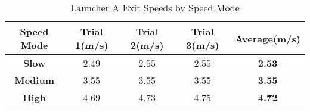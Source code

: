 \documentclass[12pt]{article}
\begin{document}
\begin{table}[H]
    \centering
    \begin{tabular}{|c|c|c|c|c|}
        \hline
        \textbf{Speed Mode} & \textbf{Trial 1}(m/s) & \textbf{Trial 2}(m/s) & \textbf{Trial 3}(m/s) & \textbf{Average}(m/s) \\ 
        \hline
        \textbf{Slow} & 2.49 & 2.55 & 2.55 & \textbf{2.53} \\ 
        \hline
        \textbf{Medium} & 3.55 & 3.55 & 3.55 & \textbf{3.55} \\ 
        \hline
        \textbf{High} & 4.69 & 4.73 & 4.75 & \textbf{4.72} \\ 
        \hline
        
    \end{tabular}
    \caption{Launcher A Exit Speeds by Speed Mode}
    \label{table:ISB}
\end{table}
\end{document}
